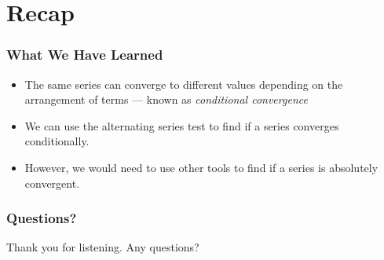 \documentclass{beamer}
\begin{document}
\section{Recap}
\begin{frame}
  \frametitle{What We Have Learned}
  \begin{itemize}
    \item<1-> The same series can converge to different values depending on the arrangement of terms --- known as \textit{conditional convergence}
    \item<2-> We can use the alternating series test to find if a series converges conditionally.
    \item<3-> However, we would need to use other tools to find if a series is absolutely convergent.
  \end{itemize}
\end{frame}
\begin{frame}
  \frametitle{Questions?}
  Thank you for listening. Any questions?
\end{frame}
\end{document}
